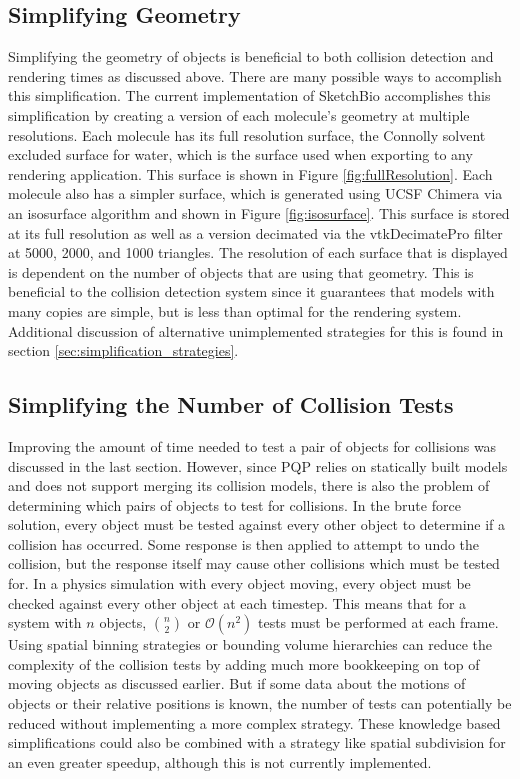 \documentclass{article} %
\begin{document}
\subsection{Simplifying Geometry}
Simplifying the geometry of objects is beneficial to both collision detection and rendering times as discussed above.  There are many possible ways to accomplish this simplification.  The current implementation of SketchBio accomplishes this simplification by creating a version of each molecule's geometry at multiple resolutions. Each molecule has its full resolution surface, the Connolly solvent excluded surface for water, which is the surface used when exporting to any rendering application. This surface is shown in Figure \ref{fig:fullResolution}. Each molecule also has a simpler surface, which is generated using UCSF Chimera via an isosurface algorithm and shown in Figure \ref{fig:isosurface}. This surface is stored at its full resolution as well as a version decimated via the vtkDecimatePro filter at 5000, 2000, and 1000 triangles.  The resolution of each surface that is displayed is dependent on the number of objects that are using that geometry.  This is beneficial to the collision detection system since it guarantees that models with many copies are simple, but is less than optimal for the rendering system.  Additional discussion of alternative unimplemented strategies for this is found in section \ref{sec:simplification_strategies}.

\subsection{Simplifying the Number of Collision Tests}
Improving the amount of time needed to test a pair of objects for collisions was discussed in the last section.  However, since PQP relies on statically built models and does not support merging its collision models, there is also the problem of determining which pairs of objects to test for collisions.  In the brute force solution, every object must be tested against every other object to determine if a collision has occurred.  Some response is then applied to attempt to undo the collision, but the response itself may cause other collisions which must be tested for. In a physics simulation with every object moving, every object must be checked against every other object at each timestep. This means that for a system with $n$ objects, ${n \choose 2}$ or $\mathcal{O}(n^2)$ tests must be performed at each frame.  Using spatial binning strategies or bounding volume hierarchies can reduce the complexity of the collision tests by adding much more bookkeeping on top of moving objects as discussed earlier.  But if some data about the motions of objects or their relative positions is known, the number of tests can potentially be reduced without implementing a more complex strategy.  These knowledge based simplifications could also be combined with a strategy like spatial subdivision for an even greater speedup, although this is not currently implemented.
\end{document}
